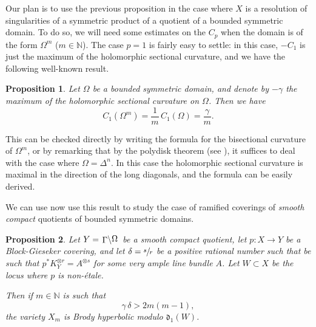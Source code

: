 \documentclass[JEP,XML,SOM,Unicode, NoEqCountersInSection,NoFloatCountersInSection,published]{cedram}
\theoremstyle{theorem}
\newtheorem{proposition}{Proposition} [section]
\theoremstyle{definition}
\newcommand{\quotient}[2]{{\left.\raisebox{-.08em}{$#1$}\middle\backslash\raisebox{.08em}{$#2$}\right.}}
\begin{document}
Our plan is to use the previous proposition in the case where $X$ is a resolution of singularities of a symmetric product of a quotient of a bounded symmetric domain. To do so, we will need some estimates on the $C_p$ when the domain is of the form $\Omega^m$ ($m \in \mathbb N$). The case $p = 1$ is fairly easy to settle: in this case, $- C_1$ is just the maximum of the holomorphic sectional curvature, and we have the following well-known result.

\begin{proposition} Let $\Omega$ be a bounded symmetric domain, and denote by $-\gamma$ the maximum of the holomorphic sectional curvature on $\Omega$. Then we have
\[
C_1(\Omega^m) = \frac{1}{m}\, C_1(\Omega) = \frac{\gamma}{m}.
\]
\end{proposition}
This can be checked directly by writing the formula for the bisectional curvature of $\Omega^m$, or by remarking that by the polydisk theorem (see \cite{mok89}), it suffices to deal with the case where $\Omega = \Delta^n$. In this case the holomorphic sectional curvature is maximal in the direction of the long diagonals, and the formula can be easily derived.

We can use now use this result to study the case of ramified coverings of \emph{smooth compact} quotients of bounded symmetric domains.

\begin{proposition} \label{prophyp}
Let $Y = \quotient{\Gamma}{\Omega}$ be a smooth compact quotient, let $p : X \to Y$ be a Block-Gieseker covering, and let $\delta = \sfrac{s}{r}$ be a positive rational number such that be such that $p^\ast K_Y^{\otimes r} = A^{\otimes s}$ for some very ample line bundle $A$. Let $W \subset X$ be the locus where $p$ is non-étale.

Then if $m \in \mathbb N$ is such that
\[
\gamma \, \delta > 2 m (m -1),
\]
the variety $X_m$ is Brody hyperbolic modulo $\mathfrak{d}_1(W)$.
\end{proposition}
\end{document}
